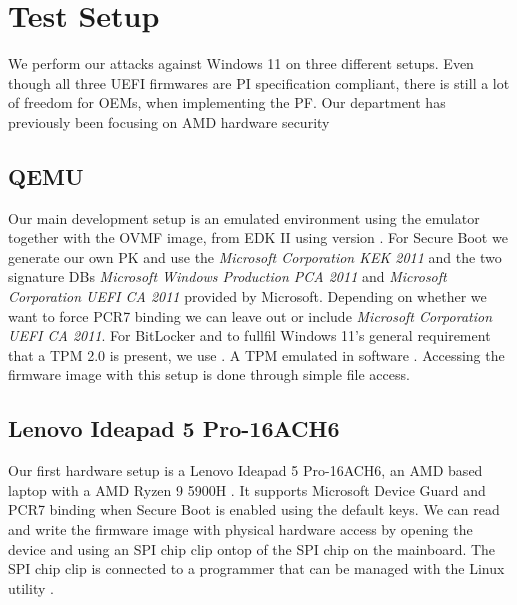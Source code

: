 
\chapter{Test Setup}
\label{sec:test-setup}

We perform our attacks against Windows 11 on three different setups.
Even though all three \ac{UEFI} firmwares are \ac{PI} specification compliant, there is still a lot of freedom for \acp{OEM}, when implementing the \ac{PF}.
Our department has previously been focusing on \ac{AMD} hardware security

\section{\acs{QEMU}}
\label{sec:test-setup:qemu}

Our main development setup is an emulated environment using the emulator  \cite{qemu} together with the \ac{OVMF} image, from \ac{EDK} II using version .
For Secure Boot we generate our own \ac{PK} and use the \emph{Microsoft Corporation \acs{KEK}  2011} and the two signature \acp{DB} \emph{Microsoft Windows Production PCA 2011} and \emph{Microsoft Corporation UEFI CA 2011} provided by Microsoft.
Depending on whether we want to force \ac{PCR}7 binding we can leave out or include \emph{Microsoft Corporation UEFI CA 2011}.
For BitLocker and to fullfil Windows 11's general requirement that a \ac{TPM} 2.0 is present, we use .
A \ac{TPM} emulated in software \cite{swtpm}.
Accessing the firmware image with this setup is done through simple file access.

\section{Lenovo Ideapad 5 Pro-16ACH6}
\label{sec:test-setup:lenovo}

Our first hardware setup is a Lenovo Ideapad 5 Pro-16ACH6, an \ac{AMD} based laptop with a \ac{AMD} Ryzen 9 5900H \cite{lenovo-ideapad}.
It supports Microsoft Device Guard and \ac{PCR}7 binding when Secure Boot is enabled using the default keys.
We can read and write the firmware image with physical hardware access by opening the device and using an \ac{SPI} chip clip ontop of the \ac{SPI} chip on the mainboard.
The \ac{SPI} chip clip is connected to a programmer that can be managed with the Linux utility .


